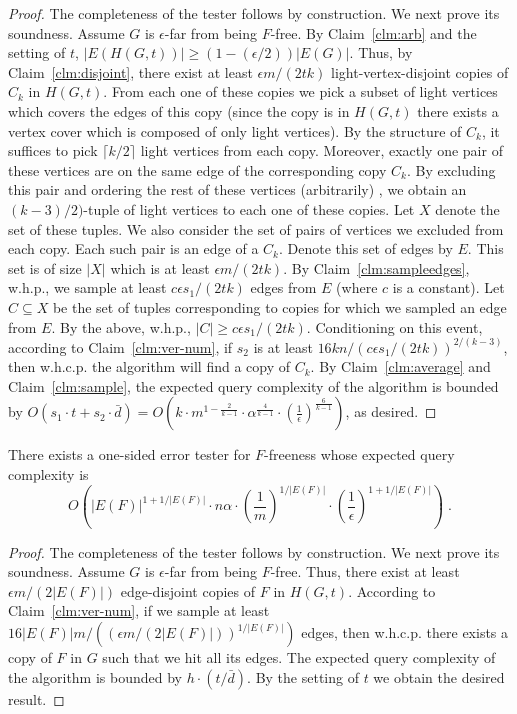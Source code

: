 \begin{proof}
The completeness of the tester follows by construction. 
We next prove its soundness. Assume $G$ is $\epsilon$-far from being $F$-free.
By Claim~\ref{clm:arb} and the setting of $t$, $|E(H(G, t))| \geq (1-(\epsilon/2)) |E(G)|$. 
Thus, by Claim~\ref{clm:disjoint}, there exist at least $\epsilon m/ (2t k)$ light-vertex-disjoint copies of $C_k$ in $H(G, t)$.
From each one of these copies we pick a subset of light vertices which covers the edges of this copy (since the copy is in $H(G, t)$ there exists a vertex cover which is composed of only light vertices).
By the structure of $C_k$, it suffices to pick $\lceil k/2 \rceil$ light vertices from each copy.
Moreover, exactly one pair of these vertices are on the same edge of the corresponding copy $C_k$.
By excluding this pair and ordering the rest of these vertices (arbitrarily) , we obtain an $(k-3)/2)$-tuple of light vertices to each one of these copies.  
Let $X$ denote the set of these tuples.
We also consider the set of pairs of vertices we excluded from each copy.
Each such pair is an edge of a $C_k$. 
Denote this set of edges by $E$.
This set is of size $|X|$ which is at least $\epsilon m/ (2t k)$.
By Claim~\ref{clm:sampleedges}, w.h.p., we sample at least $c \epsilon s_1/ (2t k) $ edges from $E$ (where $c$ is a constant).
Let $C \subseteq X$ be the set of tuples corresponding to copies for which we sampled an edge from $E$.
By the above, w.h.p., $|C| \geq c \epsilon s_1/ (2t k) $. 
Conditioning on this event, according to Claim~\ref{clm:ver-num}, if $s_2$ is at least $16 k n / (c \epsilon s_1/ (2t k))^{2/(k-3)}$, then w.h.c.p. the algorithm will find a copy of $C_k$. 
By Claim~\ref{clm:average} and Claim~\ref{clm:sample}, the expected query complexity of the algorithm is bounded by $O(s_1 \cdot t + s_2 \cdot \bar{d}) = O\left(k \cdot m^{1- \frac{2}{k-1}} \cdot \alpha^{\frac{4}{k-1}} \cdot \left( \frac{1}{\epsilon}\right)^{\frac{6}{k-1}} \right)$, as desired.
\end{proof}

\begin{theorem}\label{thm:Gen-F-ub2}
There exists a one-sided error tester for $F$-freeness whose expected query complexity is $$O\left(|E(F)|^{1+1/|E(F)|} \cdot n\alpha \cdot \left(\frac{1}{m }\right)^{1/|E(F)|} \cdot \left(\frac{1}{\epsilon}\right)^{1+1/|E(F)|}\right)\;.$$ 
\end{theorem}

\begin{proof}
The completeness of the tester follows by construction. 
We next prove its soundness. Assume $G$ is $\epsilon$-far from being $F$-free.
Thus, there exist at least $\epsilon m/ (2|E(F)|)$ edge-disjoint copies of $F$ in $H(G, t)$.
According to Claim~\ref{clm:ver-num}, if we sample at least $16 |E(F)| m / ((\epsilon m/ (2|E(F)|))^{1/|E(F)|})$ edges, then w.h.c.p. there exists a copy of $F$ in $G$ such that we hit all its edges.
The expected query complexity of the algorithm is bounded by $h \cdot (t/\bar{d})$. By the setting of $t$ we obtain the desired result. 
\end{proof}

